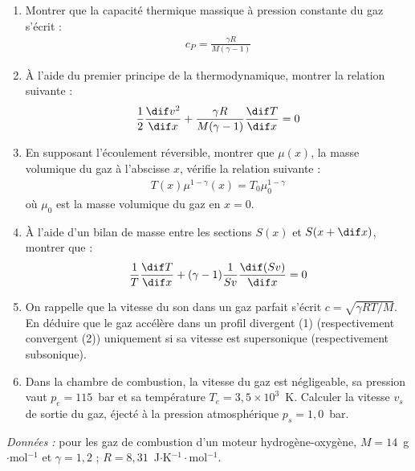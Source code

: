 \begin{enumerate}

	\item Montrer que la capacité thermique massique à pression constante du gaz s'écrit :
	\begin{align*}
		c_P=\frac{\gamma R}{M(\gamma-1)}
	\end{align*}

	\item À l'aide du premier principe de la thermodynamique, montrer la relation suivante :
	\begin{align*}
		\frac{1}{2}\frac{\dif v^2}{\dif x}+\frac{\gamma R}{M(\gamma-1)}\frac{\dif T}{\dif x}=0
	\end{align*}

	\item En supposant l'écoulement réversible, montrer que $\mu(x)$, la masse volumique du gaz à l'abscisse $x$, vérifie la relation suivante :
	\begin{align*}
		T(x)\mu^{1-\gamma}(x)=T_0\mu_0^{1-\gamma}
	\end{align*}
	où $\mu_0$ est la masse volumique du gaz en $x=0$.

	\item À l'aide d'un bilan de masse entre les sections $S(x)$ et $S(x+\dif x)$, montrer que :
	\begin{align*}
		\frac{1}{T}\frac{\dif T}{\dif x}+(\gamma-1)\frac{1}{Sv}\frac{\dif (Sv)}{\dif x}=0
	\end{align*}

	\item On rappelle que la vitesse du son dans un gaz parfait s'écrit $c=\sqrt{\gamma RT/M}$. En déduire que le gaz accélère dans un profil divergent (1) (respectivement convergent (2)) uniquement si sa vitesse est supersonique (respectivement subsonique).

	\item Dans la chambre de combustion, la vitesse du gaz est négligeable, sa pression vaut $p_e=115$~bar et sa température $T_e=3{,}5\times10^{3}$~K. Calculer la vitesse $v_s$ de sortie du gaz, éjecté à la pression atmosphérique $p_s=1{,}0$~bar.

\end{enumerate}

\textit{Données :} pour les gaz de combustion d'un moteur hydrogène-oxygène, $M=14$~g$\cdot$mol$^{-1}$ et $\gamma=1{,}2$ ; $R=8{,}31$~J$\cdot$K$^{-1}\cdot$mol$^{-1}$.

\newpage

